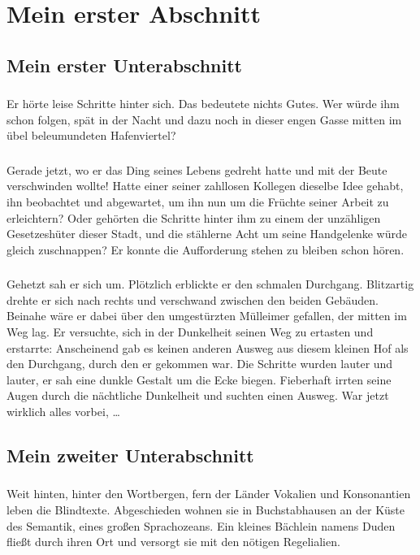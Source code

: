 \thispagestyle{empty}
\section{Mein erster Abschnitt}\label{sec:abschnitt1}
%
\subsection{Mein erster Unterabschnitt}
\subsubsection{}
Er hörte leise Schritte hinter sich. 
Das bedeutete nichts Gutes. 
Wer würde ihm schon folgen, spät in der Nacht und dazu noch in dieser engen Gasse mitten im übel beleumundeten Hafenviertel? 
\subsubsection{}
Gerade jetzt, wo er das Ding seines Lebens gedreht hatte und mit der Beute verschwinden wollte! 
Hatte einer seiner zahllosen Kollegen dieselbe Idee gehabt, ihn beobachtet und abgewartet, um ihn nun um die Früchte seiner Arbeit zu erleichtern? 
Oder gehörten die Schritte hinter ihm zu einem der unzähligen Gesetzeshüter dieser Stadt, und die stählerne Acht um seine Handgelenke würde gleich zuschnappen? 
Er konnte die Aufforderung stehen zu bleiben schon hören. 
\subsubsection{}
Gehetzt sah er sich um. Plötzlich erblickte er den schmalen Durchgang. Blitzartig drehte er sich nach rechts und verschwand zwischen den beiden Gebäuden. 
Beinahe wäre er dabei über den umgestürzten Mülleimer gefallen, der mitten im Weg lag. 
Er versuchte, sich in der Dunkelheit seinen Weg zu ertasten und erstarrte: Anscheinend gab es keinen anderen Ausweg aus diesem kleinen Hof als den Durchgang, durch den er gekommen war. 
Die Schritte wurden lauter und lauter, er sah eine dunkle Gestalt um die Ecke biegen. 
Fieberhaft irrten seine Augen durch die nächtliche Dunkelheit und suchten einen Ausweg. 
War jetzt wirklich alles vorbei, \ldots
\subsection{Mein zweiter Unterabschnitt}
\subsubsection{}
Weit hinten, hinter den Wortbergen, fern der Länder Vokalien und Konsonantien leben die Blindtexte. 
Abgeschieden wohnen sie in Buchstabhausen an der Küste des Semantik, eines großen Sprachozeans. 
Ein kleines Bächlein namens Duden fließt durch ihren Ort und versorgt sie mit den nötigen Regelialien. 
